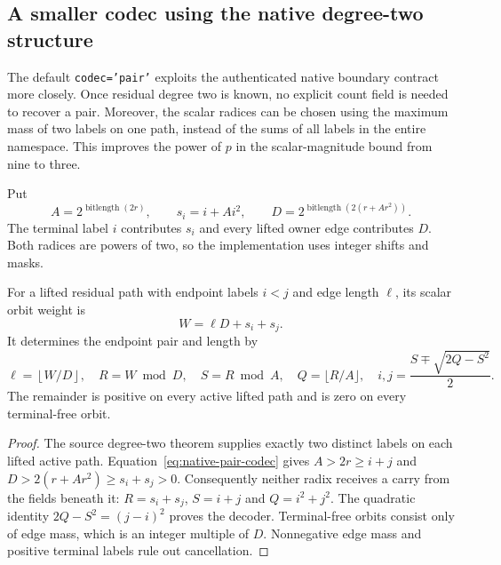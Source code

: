 \subsection{A smaller codec using the native degree-two structure}

The default \texttt{codec='pair'} exploits the authenticated native
boundary contract more closely.  Once residual degree two is known, no
explicit count field is needed to recover a pair.  Moreover, the scalar
radices can be chosen using the maximum mass of two labels on one path,
instead of the sums of all labels in the entire namespace.  This improves
the power of $p$ in the scalar-magnitude bound from nine to three.

Put
\begin{equation}
\label{eq:native-pair-codec}
 A=2^{\operatorname{bitlength}(2r)},\qquad
 s_i=i+A i^2,\qquad
 D=2^{\operatorname{bitlength}(2(r+A r^2))}.
\end{equation}
The terminal label $i$ contributes $s_i$ and every lifted owner edge
contributes $D$.  Both radices are powers of two, so the implementation
uses integer shifts and masks.

\begin{lemma}
\label{lem:native-pair-packing}
For a lifted residual path with endpoint labels $i<j$ and edge length
$\ell$, its scalar orbit weight is
\[
                        W=\ell D+s_i+s_j.
\]
It determines the endpoint pair and length by
\begin{equation}
\label{eq:native-pair-decode}
 \ell=\left\lfloor W/D\right\rfloor,\quad
 R=W\bmod D,\quad S=R\bmod A,\quad Q=\lfloor R/A\rfloor,
 \quad i,j=\frac{S\mp\sqrt{2Q-S^2}}2.
\end{equation}
The remainder is positive on every active lifted path and is zero on
every terminal-free orbit.
\end{lemma}

\begin{proof}
The source degree-two theorem supplies exactly two distinct labels on
each lifted active path.  Equation~\eqref{eq:native-pair-codec} gives
$A>2r\geq i+j$ and $D>2(r+A r^2)\geq s_i+s_j>0$.
Consequently neither radix receives a carry from the fields beneath it:
$R=s_i+s_j$, $S=i+j$ and $Q=i^2+j^2$.  The quadratic identity
$2Q-S^2=(j-i)^2$ proves the decoder.  Terminal-free orbits consist only of
edge mass, which is an integer multiple of $D$.  Nonnegative edge mass
and positive terminal labels rule out cancellation.
\end{proof}

